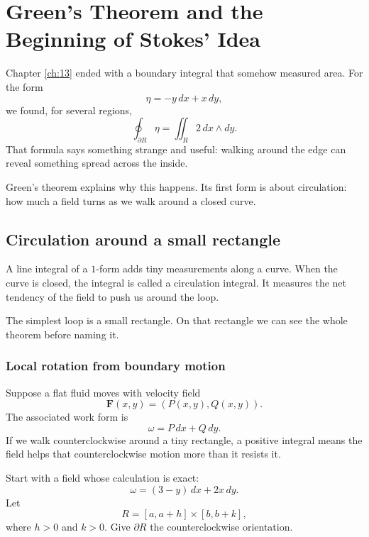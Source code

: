 
\chapter{Green's Theorem and the Beginning of Stokes' Idea}
\label{ch:14}

Chapter \ref{ch:13} ended with a boundary integral that somehow measured area.
For the form
\[
    \eta=-y\,dx+x\,dy,
\]
we found, for several regions,
\[
    \oint_{\partial R}\eta
    =
    \iint_R 2\,dx\wedge dy.
\]
That formula says something strange and useful: walking around the edge can reveal
something spread across the inside.

Green's theorem explains why this happens.  Its first form is about circulation: how
much a field turns as we walk around a closed curve.

\section{Circulation around a small rectangle}
\label{sec:14.1}

A line integral of a \(1\)-form adds tiny measurements along a curve.  When the curve
is closed, the integral is called a circulation integral.  It measures the net tendency of
the field to push us around the loop.

The simplest loop is a small rectangle.  On that rectangle we can see the whole theorem
before naming it.

\subsection{Local rotation from boundary motion}

Suppose a flat fluid moves with velocity field
\[
    \mathbf F(x,y)=(P(x,y),Q(x,y)).
\]
The associated work form is
\[
    \omega=P\,dx+Q\,dy.
\]
If we walk counterclockwise around a tiny rectangle, a positive integral means the field
helps that counterclockwise motion more than it resists it.

Start with a field whose calculation is exact:
\[
    \omega=(3-y)\,dx+2x\,dy.
\]
Let
\[
    R=[a,a+h]\times[b,b+k],
\]
where \(h>0\) and \(k>0\).  Give \(\partial R\) the counterclockwise orientation.


